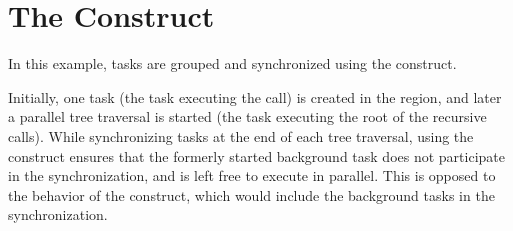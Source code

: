 \pagebreak
\section{The  Construct}
\label{sec:taskgroup}

In this example, tasks are grouped and synchronized using the  
construct.

Initially, one task (the task executing the  
call) is created in the  region, and later a parallel tree traversal 
is started (the task executing the root of the recursive  
calls). While synchronizing tasks at the end of each tree traversal, using the 
 construct ensures that the formerly started background task 
does not participate in the synchronization, and is left free to execute in parallel. 
This is opposed to the behavior of the  construct, which would 
include the background tasks in the synchronization.



